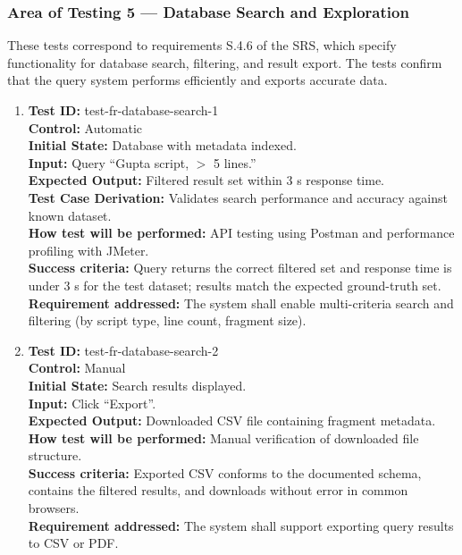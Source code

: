 \documentclass[12pt, titlepage]{article}
\begin{document}
\subsubsection{Area of Testing 5 — Database Search and Exploration}

These tests correspond to requirements S.4.6 of the SRS, which specify functionality for database search, filtering, and result export. The tests confirm that the query system performs efficiently and exports accurate data.

\begin{enumerate}
    \item
    \textbf{Test ID:} test-fr-database-search-1\\
    \textbf{Control:} Automatic\\
    \textbf{Initial State:} Database with metadata indexed.\\
    \textbf{Input:} Query ``Gupta script, $>$ 5 lines.''\\
    \textbf{Expected Output:} Filtered result set within 3 s response time.\\
    \textbf{Test Case Derivation:} Validates search performance and accuracy against known dataset.\\
    \textbf{How test will be performed:} API testing using Postman and performance profiling with JMeter.\\
    \textbf{Success criteria:} Query returns the correct filtered set and response time is under 3 s for the test dataset; results match the expected ground-truth set.\\
    \textbf{Requirement addressed:} The system shall enable multi-criteria search and filtering (by script type, line count, fragment size).\\

    \item
    \textbf{Test ID:} test-fr-database-search-2\\
    \textbf{Control:} Manual\\
    \textbf{Initial State:} Search results displayed.\\
    \textbf{Input:} Click ``Export''.\\
    \textbf{Expected Output:} Downloaded CSV file containing fragment metadata.\\
    \textbf{How test will be performed:} Manual verification of downloaded file structure.\\
    \textbf{Success criteria:} Exported CSV conforms to the documented schema, contains the filtered results, and downloads without error in common browsers.\\
    \textbf{Requirement addressed:} The system shall support exporting query results to CSV or PDF.\\
\end{enumerate}
\end{document}
